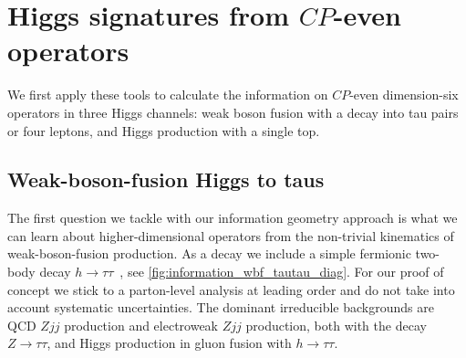 \section{Higgs signatures from $CP$-even operators}
\label{sec:information_application_even}

We first apply these tools to calculate the information on $CP$-even
dimension-six operators in three Higgs channels: weak boson fusion
with a decay into tau pairs or four leptons, and Higgs production with
a single top.



\subsection{Weak-boson-fusion Higgs to taus}
\label{sec:information_wbf_taus}

The first question we tackle with our information geometry approach is
what we can learn about higher-dimensional operators from the
non-trivial kinematics of weak-boson-fusion production. As a decay we
include a simple fermionic two-body decay
$h \to \tau \tau$~\cite{Rainwater:1998kj, Plehn:1999xi}, see
\autoref{fig:information_wbf_tautau_diag}. For our proof of concept we
stick to a parton-level analysis at leading order and do not take into
account systematic uncertainties.  The dominant irreducible
backgrounds are QCD $Zjj$ production and electroweak $Zjj$ production,
both with the decay $Z \to \tau \tau$, and Higgs production in gluon
fusion with $h \to \tau \tau$.

